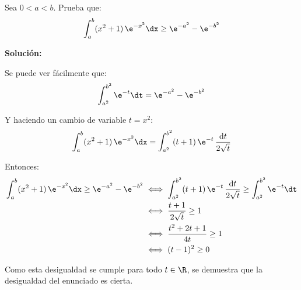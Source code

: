 \documentclass[../../main.tex]{subfiles}
\begin{document}
  \begin{shaded}
    Sea $0 < a < b$. Prueba que:
    $$
    \int_a^b (x^2 + 1) \, \e^{-x^2} \dx \geq \e^{-a^2} - \e^{-b^2}
    $$
  \end{shaded}

  \textbf{Solución:}

  Se puede ver fácilmente que:
  $$
  \int_{a^2}^{b^2} \e^{-t} \dt = \e^{-a^2} - \e^{-b^2}
  $$

  Y haciendo un cambio de variable $t = x^2$:
  $$
  \int_a^b (x^2 + 1) \, \e^{-x^2} \dx = \int_{a^2}^{b^2} (t + 1) \, \e^{-t} \, \frac{\text{d}t}{2 \sqrt{t}}
  $$

  Entonces:
  \begin{equation*}
    \begin{split}
      \int_a^b (x^2 + 1) \, \e^{-x^2} \dx \geq \e^{-a^2} - \e^{-b^2} & \iff
      \int_{a^2}^{b^2} (t + 1) \, \e^{-t} \, \frac{\text{d}t}{2 \sqrt{t}} \geq \int_{a^2}^{b^2} \e^{-t} \dt \\ & \iff
      \frac{t + 1}{2 \sqrt{t}} \geq 1 \\ & \iff
      \frac{t^2 + 2t + 1}{4t} \geq 1 \\ & \iff
      (t - 1)^2 \geq 0
    \end{split}
  \end{equation*}

  Como esta desigualdad se cumple para todo $t \in \R$, se demuestra que la desigualdad del enunciado es cierta.
\end{document}
